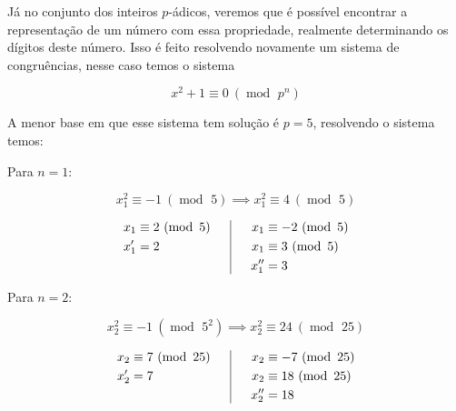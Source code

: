 \documentclass{report}
\DeclareMathOperator{\modulo}{mod \ }
\theoremstyle{definition}
\begin{document}
Já no conjunto dos inteiros $p$-ádicos, veremos que é possível encontrar a representação de um número com essa propriedade, realmente determinando os dígitos deste número. Isso é feito resolvendo novamente um sistema de congruências, nesse caso temos o sistema

\begin{equation*}
    x^2 + 1 \equiv 0 \ (\modulo p^n)
\end{equation*}

A menor base em que esse sistema tem solução é $p=5$, resolvendo o sistema temos:

\bigskip

Para $n = 1$:

\begin{equation*}
    x_1^2 \equiv -1 \ (\modulo 5) \implies x_1^2 \equiv 4 \ (\modulo 5)
\end{equation*}

\begin{equation*}
    \begin{aligned}[c]
        x_1 &\equiv 2 \ (\modulo 5)\\
        x'_1 &= 2\\
        \hphantom{0}
    \end{aligned}
    \hphantom{OO}\vline\hphantom{OO}
    \begin{aligned}[c]
        x_1 &\equiv -2 \ (\modulo 5)\\
        x_1 &\equiv 3 \ (\modulo 5)\\
        x''_1 &= 3
    \end{aligned}
\end{equation*}

Para $n = 2$:

\begin{equation*}
    x_2^2 \equiv -1 \ (\modulo 5^2) \implies x_2^2 \equiv 24 \ (\modulo 25)
\end{equation*}

\begin{equation*}
    \begin{aligned}[c]
        x_2 &\equiv 7 \ (\modulo 25)\\
        x'_2 &= 7\\
        \hphantom{0}
    \end{aligned}
    \hphantom{OO}\vline\hphantom{OO}
    \begin{aligned}[c]
        x_2 &\equiv -7 \ (\modulo 25)\\
        x_2 &\equiv 18 \ (\modulo 25)\\
        x''_2 &= 18
    \end{aligned}
\end{equation*}
\end{document}
